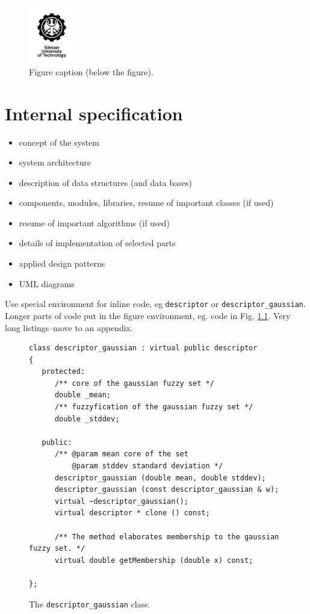 \documentclass[a4paper,twoside,12pt]{book}
\begin{document}
\begin{figure}
\centering
\includegraphics[width=2cm]{logo_eng.jpg}
\caption{Figure caption (below the figure).}
\label{fig:2}
\end{figure}


\chapter{Internal specification}

\begin{itemize}
\item concept of the system
\item system architecture
\item description of data structures (and data bases)
\item components, modules, libraries, resume of important classes (if used)
\item resume of important algorithms (if used)
\item details of implementation of selected parts
\item applied design patterns
\item UML diagrams
\end{itemize}


Use special environment for inline code, eg \lstinline|descriptor| or \lstinline|descriptor_gaussian|. 
Longer parts of code put in the figure environment, eg. code in Fig. \ref{fig:pseudokod}. Very long listings–move to an appendix.

\begin{figure}
\centering
\begin{lstlisting}
class descriptor_gaussian : virtual public descriptor
{
   protected:
      /** core of the gaussian fuzzy set */
      double _mean;
      /** fuzzyfication of the gaussian fuzzy set */
      double _stddev;
      
   public:
      /** @param mean core of the set
          @param stddev standard deviation */
      descriptor_gaussian (double mean, double stddev);
      descriptor_gaussian (const descriptor_gaussian & w);
      virtual ~descriptor_gaussian();
      virtual descriptor * clone () const;
      
      /** The method elaborates membership to the gaussian fuzzy set. */
      virtual double getMembership (double x) const;
     
};
\end{lstlisting}
\caption{The \lstinline|descriptor_gaussian| class.}
\label{fig:pseudokod}
\end{figure}
\end{document}
